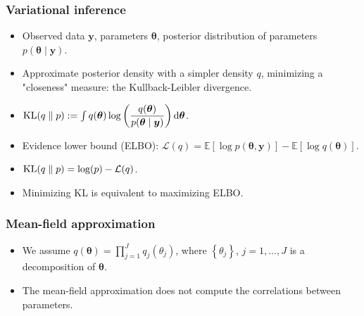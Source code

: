 \documentclass{beamer}
\DeclareMathOperator*{\KL}{{\rm KL}}
\begin{document}
\begin{frame}
\frametitle{Variational inference}
\begin{itemize}
\item Observed data $\boldsymbol{y}$, parameters $\boldsymbol{\theta}$, posterior distribution of parameters $p(\boldsymbol{\theta} \mid \boldsymbol{y})$.
\item Approximate posterior density with a simpler density $q$, minimizing a "closeness" measure: the Kullback-Leibler divergence.
\item $\KL(q\parallel p) := \int q(\boldsymbol{\theta})\log \left(\dfrac{q(\boldsymbol{\theta})}{p(\boldsymbol{\theta} \mid \boldsymbol{y})}\right) \mathrm{d}\boldsymbol{\theta}$.
\item Evidence lower bound (ELBO): $\mathcal{L}(q) = \mathbb{E}\left[\log p(\boldsymbol{\theta},\boldsymbol{y})\right] - \mathbb{E}\left[\log q(\boldsymbol{\theta})\right]$.
\item $\KL(q\parallel p) = \log(p) - \mathcal{L}(q)$.
\item Minimizing KL is equivalent to maximizing ELBO.
\end{itemize}
\end{frame}

\begin{frame}
\frametitle{Mean-field approximation}
\begin{itemize}
\item We assume $q(\boldsymbol{\theta}) = \prod_{j=1}^Jq_j(\theta_j)$, where $\left\lbrace\theta_j\right\rbrace$, $j=1,\ldots,J$ is a decomposition of $\boldsymbol{\theta}$.
\item The mean-field approximation does not compute the correlations between parameters.
\end{itemize}
\begin{figure}
\centering
{}\end{figure}
\end{frame}
\end{document}
